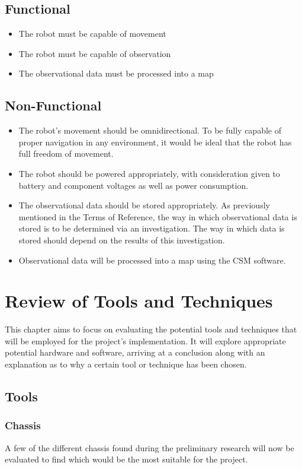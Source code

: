 			\section{Functional}
			\begin{itemize}
				\item The robot must be capable of movement
				\item The robot must be capable of observation
				\item The observational data must be processed into a map
			\end{itemize}
			
			
			\section{Non-Functional}
			\begin{itemize}
				\item The robot's movement should be omnidirectional. To be fully capable of proper navigation in any environment, it would be ideal that the robot has full freedom of movement.
				\item The robot should be powered appropriately, with consideration given to battery and component voltages as well as power consumption.
				\item The observational data should be stored appropriately. As previously mentioned in the Terms of Reference, the way in which observational data is stored is to be determined via an investigation. The way in which data is stored should depend on the results of this investigation.
				\item Observational data will be processed into a map using the CSM software.
			\end{itemize}
		
		
		\chapter{Review of Tools and Techniques}
		This chapter aims to focus on evaluating the potential tools and techniques that will be employed for the project's implementation. It will explore appropriate potential hardware and software, arriving at a conclusion along with an explanation as to why a certain tool or technique has been chosen.
			\section{Tools}
				\subsection{Chassis}
					A few of the different chassis found during the preliminary research will now be evaluated to find which would be the most suitable for the project.
					
